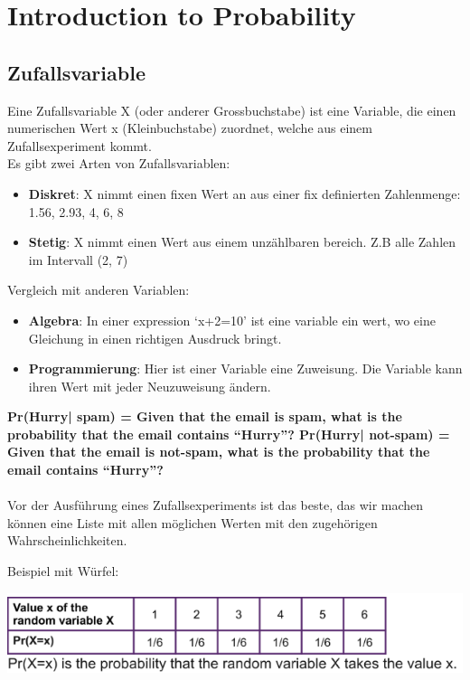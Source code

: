 \section{Introduction to Probability}
\subsection{Zufallsvariable}
Eine Zufallsvariable X (oder anderer Grossbuchstabe) ist eine Variable, die einen numerischen Wert x (Kleinbuchstabe) zuordnet, welche aus einem Zufallsexperiment kommt.\\

Es gibt zwei Arten von Zufallsvariablen:
\begin{itemize}
\item \textbf{Diskret}: X nimmt einen fixen Wert an aus einer fix definierten Zahlenmenge: {1.56, 2.93, 4, 6, 8}
\item \textbf{Stetig}: X nimmt einen Wert aus einem unzählbaren bereich. Z.B alle Zahlen im Intervall (2, 7)
\end{itemize}

Vergleich mit anderen Variablen:
\begin{itemize}
\item \textbf{Algebra}: In einer expression ‘x+2=10’ ist eine variable ein wert, wo eine Gleichung in einen richtigen Ausdruck bringt.
\item \textbf{Programmierung}: Hier ist einer Variable eine Zuweisung. Die Variable kann ihren Wert mit jeder Neuzuweisung ändern.
\end{itemize}
\textbf{Pr(Hurry| spam) = Given that the email is spam, what is the probability that the email contains “Hurry”?
Pr(Hurry| not-spam) = Given that the email is not-spam, what is the probability that the email contains “Hurry”?}
\\\\
Vor der Ausführung eines Zufallsexperiments ist das beste, das wir machen können eine Liste mit allen möglichen Werten mit den zugehörigen Wahrscheinlichkeiten.

Beispiel mit Würfel:

\includegraphics[width=\linewidth]{img/dice.png}

